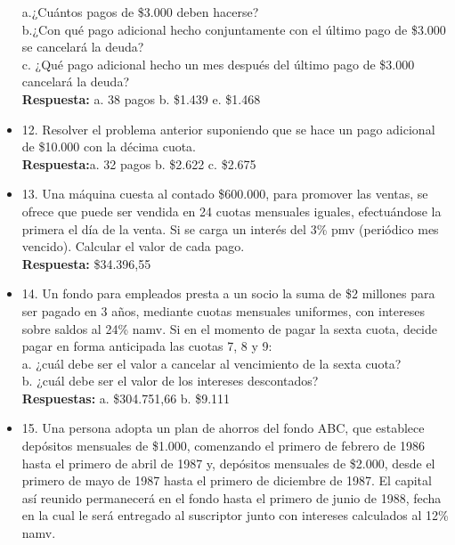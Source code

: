 \begin{itemize}
	a.¿Cuántos pagos de \$3.000 deben hacerse?\\
	b.¿Con qué pago adicional hecho conjuntamente con el último pago de \$3.000 se cancelará la deuda?\\
	c. ¿Qué pago adicional hecho un mes después del último pago de \$3.000 cancelará la deuda?\\
	\textbf{Respuesta:} a. 38 pagos\hspace{1,5cm} b. \$1.439\hspace{1,5cm} e. \$1.468\\
	\medskip
	\item 12. Resolver el problema anterior suponiendo que se hace un pago adicional de \$10.000 con la décima cuota.\\
	\textbf{Respuesta:}a. 32 pagos \hspace{1,5cm} b. \$2.622 \hspace{1,5cm} c. \$2.675\\
	\medskip
	\item 13. Una máquina cuesta al contado \$600.000, para promover las ventas, se ofrece que puede ser vendida en 24 cuotas mensuales iguales, efectuándose la primera el día de la venta. Si se carga un interés del 3\% pmv (periódico mes vencido). Calcular el valor de cada pago.\\
	\textbf{Respuesta:} \$34.396,55\\
	\medskip
	\item 14. Un fondo para empleados presta a un socio la suma de \$2 millones para ser pagado en 3 años, mediante cuotas mensuales uniformes, con intereses sobre saldos al 24\% namv. Si en el momento de pagar la sexta cuota, decide pagar en forma anticipada las cuotas 7, 8 y 9:\\
	
	a. ¿cuál debe ser el valor a cancelar al vencimiento de la sexta cuota?\\
	b. ¿cuál debe ser el valor de los intereses descontados?\\
	\textbf{Respuestas:} a. \$304.751,66 \hspace{1,5cm}b. \$9.111\\
	\medskip
	\item 15. Una  persona adopta un plan de ahorros del fondo ABC, que establece depósitos mensuales de \$1.000, comenzando el primero de febrero de 1986 hasta el primero de abril de 1987 y, depósitos mensuales de \$2.000, desde el primero de mayo de 1987 hasta el primero de diciembre de 1987. El capital así reunido permanecerá en el fondo hasta el primero de junio de 1988, fecha en la cual le será entregado al suscriptor junto con intereses calculados al 12\% namv. \\
	

\end{itemize}
